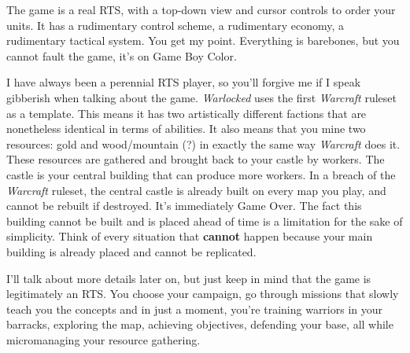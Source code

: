 \documentclass{book}
\begin{document}
\FloatBarrier\vspace{\baselineskip}\begin{figure}[H]\end{figure}
\FloatBarrier\vspace{\baselineskip}\begin{figure}[H]\end{figure}
The game is a real RTS, with a top-down view and cursor controls to order your units. It has a rudimentary control scheme, a rudimentary economy, a rudimentary tactical system. You get my point. Everything is barebones, but you cannot fault the game, it’s on Game Boy Color.\par
I have always been a perennial RTS player, so you’ll forgive me if I speak gibberish when talking about the game. \emph{Warlocked} uses the first \emph{Warcraft} ruleset as a template. This means it has two artistically different factions that are nonetheless identical in terms of abilities. It also means that you mine two resources: gold and wood/mountain (?) in exactly the same way \emph{Warcraft} does it. These resources are gathered and brought back to your castle by workers. The castle is your central building that can produce more workers. In a breach of the \emph{Warcraft} ruleset, the central castle is already built on every map you play, and cannot be rebuilt if destroyed. It’s immediately Game Over. The fact this building cannot be built and is placed ahead of time is a limitation for the sake of simplicity. Think of every situation that \textbf{cannot} happen because your main building is already placed and cannot be replicated.\par
I’ll talk about more details later on, but just keep in mind that the game is legitimately an RTS. You choose your campaign, go through missions that slowly teach you the concepts and in just a moment, you’re training warriors in your barracks, exploring the map, achieving objectives, defending your base, all while micromanaging your resource gathering.\par
\FloatBarrier\vspace{\baselineskip}\begin{figure}[H]\end{figure}
\end{document}
